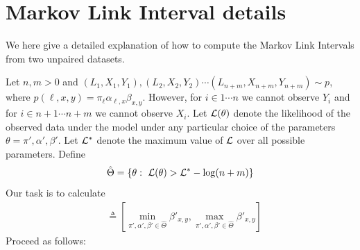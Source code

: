 \documentclass{article}
\theoremstyle{definition}
\begin{document}
\appendix

\section{Markov Link Interval details}
\label{sec:mlmdetails}

We here give a detailed explanation of how to compute the Markov Link Intervals from two unpaired datasets.

Let $n,m>0$ and $(L_1,X_1,Y_1),(L_2,X_2,Y_2) \cdots (L_{n+m},X_{n+m},Y_{n+m}) \sim p$, where $p(\ell,x,y)=\pi_\ell \alpha_{\ell,x} \beta_{x,y}$.  However, for $i\in 1\cdots n$ we cannot observe $Y_i$ and for $i\in n+1 \cdots n+m$ we cannot observe $X_i$.  Let $\mathcal{L}(\theta)$ denote the likelihood of the observed data under the model under any particular choice of the parameters $\theta = \pi',\alpha',\beta'$.  Let $\mathcal{L}^*$ denote the maximum value of $\mathcal{L}$ over all possible parameters.  Define
\[
\hat \Theta=\left\{\theta:\ \LL(\theta) > \LL^* - \log(n + m)\right\}
\]
Our task is to calculate
\begin{align*}
[\hat \beta^-_{x,y},\hat \beta^+_{x,y}] &\triangleq \left[\min_{\pi',\alpha',\beta' \in \hat \Theta} \beta'_{x,y},\max_{\pi',\alpha',\beta' \in \hat \Theta}\beta'_{x,y}\right]
\end{align*}
Proceed as follows:
\end{document}
